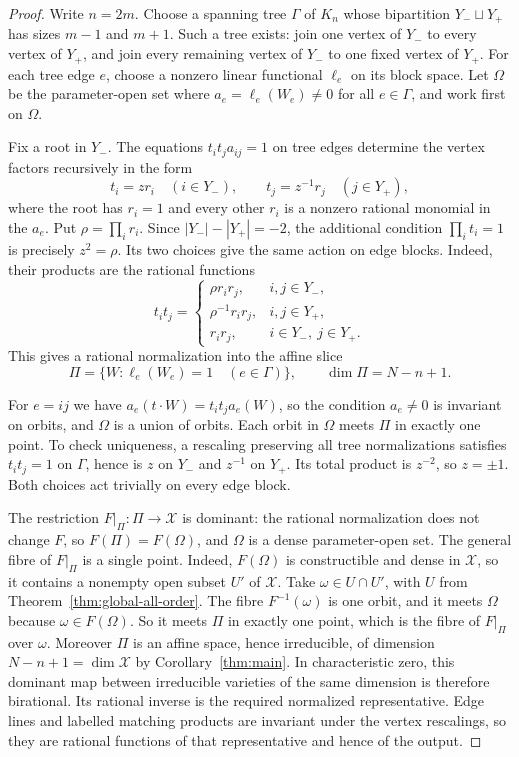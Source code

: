 \documentclass[11pt]{article}
\theoremstyle{remark}\newtheorem{remark}[theorem]{Remark}
\newcommand{\cX}{\mathcal X}
\begin{document}
\begin{proof}
Write $n=2m$. Choose a spanning tree $\Gamma$ of $K_n$ whose
bipartition $Y_-\sqcup Y_+$ has sizes $m-1$ and $m+1$. Such a tree
exists: join one vertex of $Y_-$ to every vertex of $Y_+$, and join
every remaining vertex of $Y_-$ to one fixed vertex of $Y_+$. For each
tree edge $e$, choose a nonzero linear functional $\ell_e$ on its block
space. Let $\Omega$ be the parameter-open set where
$a_e=\ell_e(W_e)\ne0$ for all $e\in\Gamma$, and work first on $\Omega$.

Fix a root in $Y_-$. The equations $t_it_j a_{ij}=1$ on tree edges
determine the vertex factors recursively in the form
\[
 t_i=z r_i\quad(i\in Y_-),\qquad
 t_j=z^{-1}r_j\quad(j\in Y_+),
\]
where the root has $r_i=1$ and every other $r_i$ is a nonzero rational
monomial in the $a_e$. Put $\rho=\prod_i r_i$. Since
$|Y_-|-|Y_+|=-2$, the additional condition $\prod_i t_i=1$ is
precisely $z^2=\rho$. Its two choices give the same action on edge
blocks. Indeed, their products are the rational functions
\[
 t_it_j=
 \begin{cases}
 \rho r_ir_j,&i,j\in Y_-,\\
 \rho^{-1}r_ir_j,&i,j\in Y_+,\\
 r_ir_j,&i\in Y_-,\ j\in Y_+.
 \end{cases}
\]
This gives a rational normalization into the affine slice
\[
 \Pi=\{W:\ell_e(W_e)=1\quad(e\in\Gamma)\},
 \qquad \dim\Pi=N-n+1.
\]

For $e=ij$ we have $a_e(t\cdot W)=t_it_ja_e(W)$, so the condition
$a_e\ne0$ is invariant on orbits, and $\Omega$ is a union of orbits.
Each orbit in $\Omega$ meets $\Pi$ in exactly one point. To check
uniqueness, a rescaling preserving all tree normalizations satisfies
$t_it_j=1$ on $\Gamma$, hence is $z$ on $Y_-$ and $z^{-1}$ on $Y_+$.
Its total product is $z^{-2}$, so $z=\pm1$. Both choices act trivially
on every edge block.

The restriction $F|_\Pi:\Pi\to\cX$ is dominant: the rational
normalization does not change $F$, so $F(\Pi)=F(\Omega)$, and $\Omega$
is a dense parameter-open set. The general fibre of $F|_\Pi$ is a
single point.
Indeed, $F(\Omega)$ is constructible and dense in $\cX$, so it contains
a nonempty open subset $U'$ of $\cX$. Take $\omega\in U\cap U'$, with
$U$ from Theorem~\ref{thm:global-all-order}. The fibre $F^{-1}(\omega)$
is one orbit, and it meets $\Omega$ because $\omega\in F(\Omega)$. So
it meets $\Pi$ in exactly one point, which is the fibre of $F|_\Pi$
over $\omega$. Moreover $\Pi$ is an affine space, hence irreducible,
of dimension $N-n+1=\dim\cX$ by Corollary~\ref{thm:main}. In
characteristic zero, this dominant map between irreducible varieties
of the same dimension is therefore birational. Its rational inverse
is the required normalized representative. Edge lines and labelled
matching products are invariant under the vertex rescalings, so they
are rational functions of that representative and hence of the output.
\end{proof}
\end{document}

